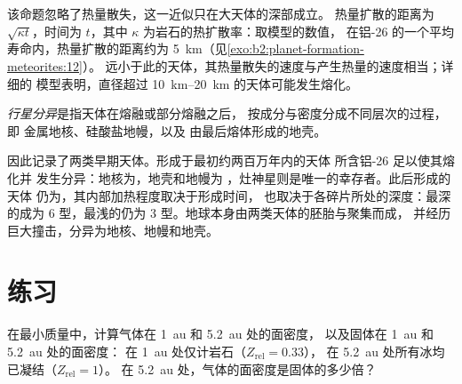 \begin{omfigure}
\par{}
\end{omfigure}

该命题忽略了热量散失，这一近似只在大天体的深部成立。
热量扩散的距离为 $\sqrt{\kappa t}$，时间为 $t$，其中
$\kappa$ 为岩石的热扩散率：取模型的数值，
在铝-26 的一个平均寿命内，热量扩散的距离约为 \qty{5}{km}（见\cref{exo:b2:planet-formation-meteorites:12}）。
远小于此的天体，其热量散失的速度与产生热量的速度相当；详细的
模型表明，直径超过 \qtyrange{10}{20}{km} 的天体可能发生熔化。

\begin{definition}[行星分异]
\label{def:b2:planet-formation-meteorites:differentiation}
\emph{行星分异}是指天体在熔融或部分熔融之后，
按成分与密度分成不同层次的过程，即
金属地核、硅酸盐地幔，以及
由最后熔体形成的地壳。
\end{definition}

因此记录了两类早期天体。形成于最初约两百万年内的天体
所含铝-26 足以使其熔化并
发生分异：地核为，地壳和地幔为
，灶神星则是唯一的幸存者。此后形成的天体
仍为，其内部加热程度取决于形成时间，
也取决于各碎片所处的深度：最深的成为 6 型，最浅的仍为
3 型。地球本身由两类天体的胚胎与聚集而成，
并经历巨大撞击，分异为地核、地幔和地壳。

\section{练习}

\begin{exercise}[$\star$]\label{exo:b2:planet-formation-meteorites:1}
在最小质量中，计算气体在 \qty{1}{au} 和 \qty{5.2}{au} 处的面密度，
以及固体在 \qty{1}{au} 和 \qty{5.2}{au} 处的面密度：
在 \qty{1}{au} 处仅计岩石（$Z_{\mathrm{rel}} = 0.33$），
在 \qty{5.2}{au} 处所有冰均已凝结（$Z_{\mathrm{rel}} = 1$）。
在 \qty{5.2}{au} 处，气体的面密度是固体的多少倍？
\end{exercise}

